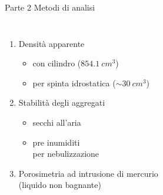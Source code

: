 \documentclass[xcolor={usenames, table, x11names}, final, 10pt]{beamer}
\begin{document}
\begin{frame}{Parte 2 \small{Metodi di analisi}}
  \begin{columns}[T]
    \begin{enumerate}
    \item<1->Densità  apparente
      \begin{itemize}
      \item<2-> con cilindro ($854.1\: cm^3$)
      \item<4-> per spinta idrostatica ($\sim 30 \: cm^3$)
      \end{itemize}
    \item<6-> Stabilità degli aggregati
      \begin{itemize}
      \item<7-> secchi all'aria
      \item<7-> pre inumiditi \\  per nebulizzazione
      \end{itemize}
    \item<8-> Porosimetria ad intrusione di mercurio \\ (liquido non bagnante)      
    \end{enumerate}
    \begin{overlayarea}{\textwidth}{0.7\textheight}
\end{overlayarea}
\end{columns}
\end{frame}
\end{document}
